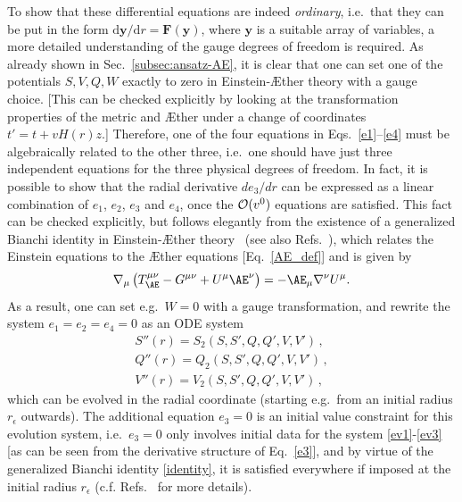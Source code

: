 \documentclass[prd,aps,twocolumn,nofootinbib,showpacs,superscriptaddress]{revtex4-1}
\newcommand\be{\begin{equation}}
\newcommand\ee{\end{equation}}
\begin{document}
To show that these differential equations are indeed
\textit{ordinary}, i.e.~that they can be put in the form
$\mbox{d}\boldsymbol{y}/\mbox{d}r=\boldsymbol{F}(\boldsymbol{y})$,
where $\boldsymbol{y}$ is a suitable array of variables, a more
detailed understanding of the gauge degrees of freedom is required.
As already shown in Sec.~\ref{subsec:ansatz-AE}, it is clear that one can set one of the potentials
$S,V,Q,W$ exactly to zero in Einstein-\AE ther theory with a gauge choice. [This can
be checked explicitly by looking at the transformation properties of
the metric and \AE ther under a change of coordinates $t'=t+vH(r)  z$.]
Therefore, one of the four equations in Eqs.~\eqref{e1}--\eqref{e4} 
must be algebraically related to the other three, i.e.~one
should have just three independent equations for the three physical
degrees of freedom.  In fact, it is possible to show that the  radial
derivative $d e_3/dr$ can be expressed as a linear combination of
$e_1$, $e_2$, $e_3$ and $e_4$, once the ${\cal O}(v^0)$ equations are
satisfied. This fact can be checked explicitly, but follows elegantly
from the existence  of a generalized Bianchi identity in
 Einstein-\AE ther theory~\cite{Jacobson:2011cc} (see also
Refs.~\cite{Barausse:2011pu,Barausse:2013nwa}), which  relates the
Einstein equations to the \AE ther equations [Eq.~\eqref{AE_def}] and is given by
\be
\label{identity}
 \nabla_\mu \left(
T_{\AE}^{\mu\nu}-G^{\mu\nu} +
U^\mu\AE^\nu\right)= -\AE_\mu\nabla^\nu U^\mu. 
\ee 
 As a result, one
can set e.g.~$W=0$ with a gauge transformation, and rewrite the system
$e_1=e_2=e_4=0$ as an ODE system
\begin{gather}
S''(r)=S_2(S,S',Q,Q',V,V')\,,\label{ev1}\\ Q''(r)=Q_2(S,S',Q,Q',V,V')\,,\label{ev2}\\ V''(r)=V_2(S,S',Q,Q',V,V')\,,\label{ev3}
\end{gather}
which can be evolved in the radial coordinate (starting e.g.~from an
initial radius $r_\epsilon$ outwards). The additional equation $e_3=0$ is an
initial value constraint for this evolution system, i.e.~$e_3=0$ only
involves initial data for the system \eqref{ev1}-\eqref{ev3} [as can
  be seen from the derivative structure of Eq.~\eqref{e3}], and by
virtue of the generalized Bianchi identity \eqref{identity}, it is
satisfied everywhere  if imposed at the initial radius $r_\epsilon$
(c.f. Refs.~\cite{Barausse:2011pu,Barausse:2013nwa} for more details).
\end{document}
